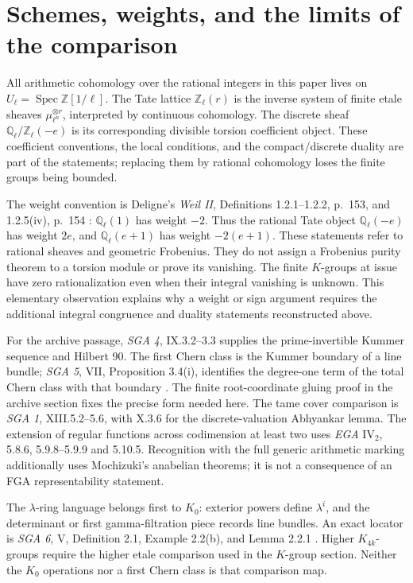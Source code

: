 \documentclass[11pt,a4paper]{article}
\theoremstyle{definition}
\begin{document}
\section{Schemes, weights, and the limits of the comparison}
\label{sec:framework}

All arithmetic cohomology over the rational integers in this paper lives on
$U_\ell=\operatorname{Spec}\mathbb Z[1/\ell]$. The Tate lattice
$\mathbb Z_\ell(r)$ is the inverse system of finite etale sheaves
$\mu_{\ell^n}^{\otimes r}$, interpreted by continuous cohomology.
The discrete sheaf $\mathbb Q_\ell/\mathbb Z_\ell(-e)$ is its corresponding
divisible torsion coefficient object. These coefficient conventions,
the local conditions, and the compact/discrete duality are part of the
statements; replacing them by rational cohomology loses the finite groups
being bounded.

The weight convention is Deligne's \emph{Weil II}, Definitions 1.2.1--1.2.2,
p.~153, and 1.2.5(iv), p.~154 \cite{DeligneWeilII}: $\mathbb Q_\ell(1)$ has weight $-2$.
Thus the rational Tate object $\mathbb Q_\ell(-e)$ has weight $2e$,
and $\mathbb Q_\ell(e+1)$ has weight $-2(e+1)$. These statements refer
to rational sheaves and geometric Frobenius. They do not assign a
Frobenius purity theorem to a torsion module or prove its vanishing.
The finite $K$-groups at issue have zero rationalization even when their
integral vanishing is unknown. This elementary observation explains why
a weight or sign argument requires the additional integral congruence
and duality statements reconstructed above.

For the archive passage, \emph{SGA 4}, IX.3.2--3.3 supplies the
prime-invertible Kummer sequence and Hilbert 90. The first Chern class
is the Kummer boundary of a line bundle; \emph{SGA 5}, VII,
Proposition 3.4(i), identifies the degree-one term of the total Chern
class with that boundary \cite{SGA5}. The finite root-coordinate gluing proof in
the archive section fixes the precise form needed here. The tame
cover comparison is \emph{SGA 1}, XIII.5.2--5.6, with X.3.6 for the
discrete-valuation Abhyankar lemma. The extension of regular functions
across codimension at least two uses \emph{EGA} $\mathrm{IV}_2$,
5.8.6, 5.9.8--5.9.9 and 5.10.5. Recognition with the full generic
arithmetic marking additionally uses Mochizuki's anabelian theorems;
it is not a consequence of an FGA representability statement.

The $\lambda$-ring language belongs first to $K_0$: exterior powers
define $\lambda^i$, and the determinant or first gamma-filtration
piece records line bundles. An exact locator is \emph{SGA 6}, V,
Definition 2.1, Example 2.2(b), and Lemma 2.2.1 \cite{SGA6}. Higher $K_{4k}$-groups
require the higher etale comparison used in the $K$-group section. Neither
the $K_0$ operations nor a first Chern class is that comparison map.
\end{document}
